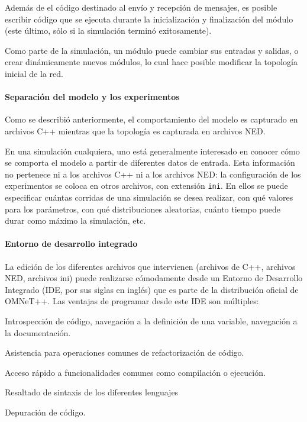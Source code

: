 \documentclass[]{article}
\begin{document}
Además de el código destinado al envío y recepción de mensajes, es posible
escribir código que se ejecuta durante la inicialización y finalización del
módulo (este último, sólo si la simulación terminó exitosamente).

Como parte de la simulación, un módulo puede cambiar sus entradas y salidas, o
crear dinámicamente nuevos módulos, lo cual hace posible modificar la topología
inicial de la red.

\paragraph{Separación del modelo y los experimentos}

Como se describió anteriormente, el comportamiento del modelo es capturado en
archivos C++ mientras que la topología es capturada en archivos NED.

En una simulación cualquiera, uno está generalmente interesado en conocer cómo
se comporta el modelo a partir de diferentes datos de entrada. Esta información
no pertenece ni a los archivos C++ ni a los archivos NED: la configuración de
los experimentos se coloca en otros archivos, con extensión \verb!ini!. En
ellos se puede especificar cuántas corridas de una simulación se desea
realizar, con qué valores para los parámetros, con qué distribuciones
aleatorias, cuánto tiempo puede durar como máximo la simulación, etc.

\paragraph{Entorno de desarrollo integrado}

La edición de los diferentes archivos que intervienen (archivos de C++,
archivos NED, archivos ini) puede realizarse cómodamente desde un Entorno de
Desarrollo Integrado (IDE, por sus siglas en inglés) que es parte de la
distribución oficial de OMNeT++. Las ventajas de programar desde este IDE son
múltiples:


Introspección de código, navegación a la definición de una variable, navegación
a la documentación.

Asistencia para operaciones comunes de refactorización de código.

Acceso rápido a funcionalidades comunes como compilación o ejecución.

Resaltado de sintaxis de los diferentes lenguajes

Depuración de código.
\end{document}
